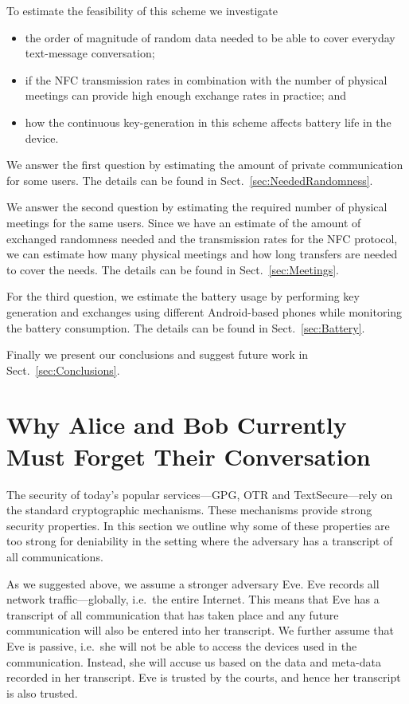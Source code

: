 To estimate the feasibility of this scheme we investigate
\begin{itemize}
  \item the order of magnitude of random data needed to be able to cover 
    everyday text-message conversation;

  \item if the \ac{NFC} transmission rates in combination with the number of 
    physical meetings can provide high enough exchange rates in practice; and

  \item how the continuous key-generation in this scheme affects battery life 
    in the device.
\end{itemize}

We answer the first question by estimating the amount of private communication 
for some users.
The details can be found in Sect.~\ref{sec:NeededRandomness}.

We answer the second question by estimating the required number of physical 
meetings for the same users.
Since we have an estimate of the amount of exchanged randomness needed and the 
transmission rates for the \ac{NFC} protocol, we can estimate how many physical 
meetings and how long transfers are needed to cover the needs.
The details can be found in Sect.~\ref{sec:Meetings}.

For the third question, we estimate the battery usage by performing key 
generation and exchanges using different Android-based phones while monitoring 
the battery consumption.
The details can be found in Sect.~\ref{sec:Battery}.

Finally we present our conclusions and suggest future work in 
Sect.~\ref{sec:Conclusions}.


\section{Why Alice and Bob Currently Must Forget Their Conversation}
\label{sec:undeniability}

The security of today's popular services---\ac{GPG}, \ac{OTR} and 
TextSecure---rely on the standard cryptographic mechanisms.
These mechanisms provide strong security properties.
In this section we outline why some of these properties are too strong for 
deniability in the setting where the adversary has a transcript of all 
communications.

As we suggested above, we assume a stronger adversary Eve.
Eve records all network traffic---globally, i.e.~the entire Internet.
This means that Eve has a transcript of all communication that has taken place 
and any future communication will also be entered into her transcript.
We further assume that Eve is passive, i.e.~she will not be able to access the 
devices used in the communication.
Instead, she will accuse us based on the data and meta-data recorded in her 
transcript.
Eve is trusted by the courts, and hence her transcript is also trusted.

